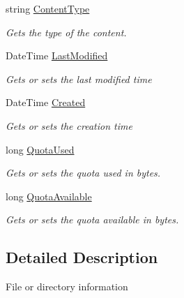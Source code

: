 \begin{DoxyCompactItemize}
string \hyperlink{classowncloudsharp_1_1_types_1_1_resource_info_a630004ab07e631b1b72a13388b2fb656}{Content\+Type}
\begin{DoxyCompactList}\small\item\em Gets the type of the content. \end{DoxyCompactList}\item 
Date\+Time \hyperlink{classowncloudsharp_1_1_types_1_1_resource_info_af03ea962da598a33df3f098031566bf6}{Last\+Modified}
\begin{DoxyCompactList}\small\item\em Gets or sets the last modified time \end{DoxyCompactList}\item 
Date\+Time \hyperlink{classowncloudsharp_1_1_types_1_1_resource_info_a663b8a81ceec10d43e82892f792e256c}{Created}
\begin{DoxyCompactList}\small\item\em Gets or sets the creation time \end{DoxyCompactList}\item 
long \hyperlink{classowncloudsharp_1_1_types_1_1_resource_info_ab9f4b3822dfabcdb61023c0b200e4785}{Quota\+Used}
\begin{DoxyCompactList}\small\item\em Gets or sets the quota used in bytes. \end{DoxyCompactList}\item 
long \hyperlink{classowncloudsharp_1_1_types_1_1_resource_info_a403b7595a054cac793ca29feac27b4e1}{Quota\+Available}
\begin{DoxyCompactList}\small\item\em Gets or sets the quota available in bytes. \end{DoxyCompactList}\end{DoxyCompactItemize}


\subsection{Detailed Description}
File or directory information 



